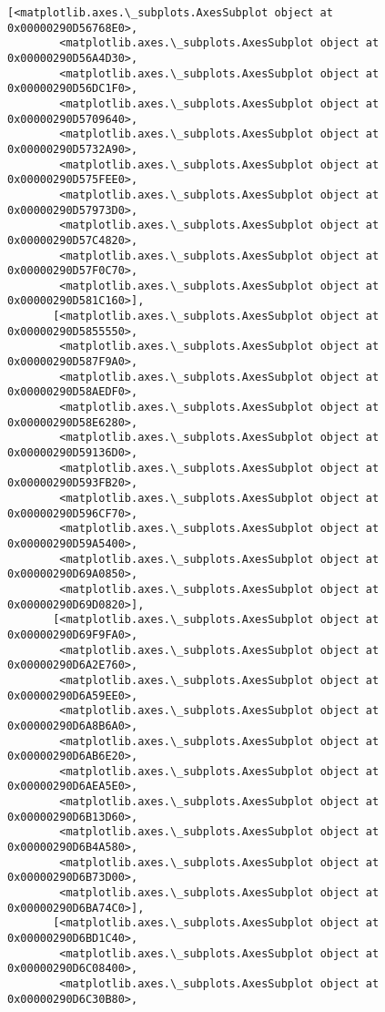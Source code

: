 \documentclass[11pt]{article}
\begin{document}
\begin{tcolorbox}[breakable, size=fbox, boxrule=.5pt, pad at break*=1mm, opacityfill=0]
\begin{Verbatim}[commandchars=\\\{\}]
       [<matplotlib.axes.\_subplots.AxesSubplot object at 0x00000290D56768E0>,
        <matplotlib.axes.\_subplots.AxesSubplot object at 0x00000290D56A4D30>,
        <matplotlib.axes.\_subplots.AxesSubplot object at 0x00000290D56DC1F0>,
        <matplotlib.axes.\_subplots.AxesSubplot object at 0x00000290D5709640>,
        <matplotlib.axes.\_subplots.AxesSubplot object at 0x00000290D5732A90>,
        <matplotlib.axes.\_subplots.AxesSubplot object at 0x00000290D575FEE0>,
        <matplotlib.axes.\_subplots.AxesSubplot object at 0x00000290D57973D0>,
        <matplotlib.axes.\_subplots.AxesSubplot object at 0x00000290D57C4820>,
        <matplotlib.axes.\_subplots.AxesSubplot object at 0x00000290D57F0C70>,
        <matplotlib.axes.\_subplots.AxesSubplot object at 0x00000290D581C160>],
       [<matplotlib.axes.\_subplots.AxesSubplot object at 0x00000290D5855550>,
        <matplotlib.axes.\_subplots.AxesSubplot object at 0x00000290D587F9A0>,
        <matplotlib.axes.\_subplots.AxesSubplot object at 0x00000290D58AEDF0>,
        <matplotlib.axes.\_subplots.AxesSubplot object at 0x00000290D58E6280>,
        <matplotlib.axes.\_subplots.AxesSubplot object at 0x00000290D59136D0>,
        <matplotlib.axes.\_subplots.AxesSubplot object at 0x00000290D593FB20>,
        <matplotlib.axes.\_subplots.AxesSubplot object at 0x00000290D596CF70>,
        <matplotlib.axes.\_subplots.AxesSubplot object at 0x00000290D59A5400>,
        <matplotlib.axes.\_subplots.AxesSubplot object at 0x00000290D69A0850>,
        <matplotlib.axes.\_subplots.AxesSubplot object at 0x00000290D69D0820>],
       [<matplotlib.axes.\_subplots.AxesSubplot object at 0x00000290D69F9FA0>,
        <matplotlib.axes.\_subplots.AxesSubplot object at 0x00000290D6A2E760>,
        <matplotlib.axes.\_subplots.AxesSubplot object at 0x00000290D6A59EE0>,
        <matplotlib.axes.\_subplots.AxesSubplot object at 0x00000290D6A8B6A0>,
        <matplotlib.axes.\_subplots.AxesSubplot object at 0x00000290D6AB6E20>,
        <matplotlib.axes.\_subplots.AxesSubplot object at 0x00000290D6AEA5E0>,
        <matplotlib.axes.\_subplots.AxesSubplot object at 0x00000290D6B13D60>,
        <matplotlib.axes.\_subplots.AxesSubplot object at 0x00000290D6B4A580>,
        <matplotlib.axes.\_subplots.AxesSubplot object at 0x00000290D6B73D00>,
        <matplotlib.axes.\_subplots.AxesSubplot object at 0x00000290D6BA74C0>],
       [<matplotlib.axes.\_subplots.AxesSubplot object at 0x00000290D6BD1C40>,
        <matplotlib.axes.\_subplots.AxesSubplot object at 0x00000290D6C08400>,
        <matplotlib.axes.\_subplots.AxesSubplot object at 0x00000290D6C30B80>,

\end{Verbatim}
\end{tcolorbox}
\end{document}
